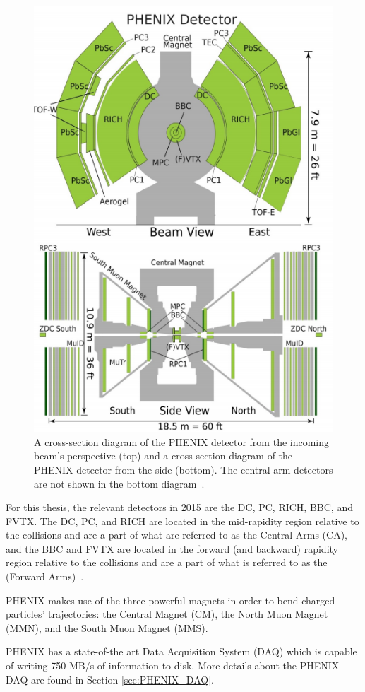 \begin{figure}[!ht]
\centering
\includegraphics[width=0.55\linewidth]{figs/phenix_schematic.png}
\caption{A cross-section diagram of the PHENIX detector from the incoming beam's perspective (top) and a cross-section diagram of the PHENIX detector from the side (bottom). The central arm detectors are not shown in the bottom diagram~\cite{Aidala201444}.}
\label{fig:phenix_schematic}
\end{figure}

For this thesis, the relevant detectors in 2015 are the DC, PC, RICH, BBC, and FVTX. The DC, PC, and RICH are located in the mid-rapidity region relative to the collisions and are a part of what are referred to as the Central Arms (CA), and the BBC and FVTX are located in the forward (and backward) rapidity region relative to the collisions and are a part of what is referred to as the (Forward Arms)~\cite{Adcox2003469}. 

PHENIX makes use of the three powerful magnets in order to bend charged particles' trajectories: the Central Magnet (CM), the North Muon Magnet (MMN), and the South Muon Magnet (MMS).

PHENIX has a state-of-the art Data Acquisition System (DAQ) which is capable of writing 750 MB/s of information to disk. More details about the PHENIX DAQ are found in Section \ref{sec:PHENIX_DAQ}.

